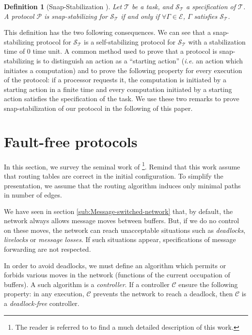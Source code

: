 \documentclass[11pt]{article}
\newtheorem{definition}{Definition}
\begin{document}
\begin{definition} [Snap-Stabilization \cite{BDPV99,BDPV07}] \label{def:snap}
Let $\mathcal{T}$ be a task, and $\mathcal{\mathcal{S}_{T}}$ a specification of $\mathcal{T}$. A protocol $\mathcal{P}$ is snap-stabilizing for $\mathcal{S_{T}}$ if and only if $\forall\Gamma\in\mathcal{E}$, $\Gamma$ satisfies $\mathcal{S_{T}}$.
\end{definition}

This definition has the two following consequences. We can see that a snap-stabilizing protocol for $\mathcal{S_{T}}$ is a self-stabilizing protocol for $\mathcal{S_{T}}$ with a stabilization time of 0 time unit. A common method used to prove that a protocol is snap-stabilizing is to distinguish an action as a ``starting action'' (\emph{i.e.} an action which initiates a computation) and to prove the following property for every execution of the protocol: if a processor requests it, the computation is initiated by a starting action in a finite time and every computation initiated by a starting action satisfies the specification of the task. We use these two remarks to prove snap-stabilization of our protocol in the following of this paper.

\section{Fault-free protocols}\label{sec:survey}

In this section, we survey the seminal work of \cite{MS78}\footnote{The reader is referred to \cite{T01} to find a much detailed description of this work.}. Remind that this work assume that routing tables are correct in the initial configuration.  To simplify the presentation, we assume that the routing algorithm induces only minimal paths in number of edges.

We have seen in section \ref{sub:Message-switched-network} that, by default, the network always allows message moves between buffers. But, if we do no control on these moves, the network can reach unacceptable situations such as \emph{deadlocks}, \emph{livelocks} or \emph{message losses}. If such situations appear, specifications of message forwarding are not respected.

In order to avoid deadlocks, we must define an algorithm which permits or forbids various moves in the network (functions of the current occupation of buffers). A such algorithm is a \emph{controller}. If a controller $\mathcal{C}$ ensure the following property: in any execution, $\mathcal{C}$ prevents the network to reach a deadlock, then $\mathcal{C}$ is a \emph{deadlock-free} controller.
\end{document}
